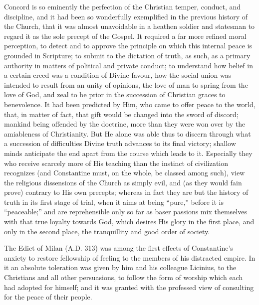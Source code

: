 Concord is so eminently the perfection of the Christian temper,
conduct, and discipline, and it had been so wonderfully exemplified in
the previous history of the Church, that it was almost
unavoidable in a heathen soldier and statesman to regard it as the
sole precept of the Gospel. It required a far more refined moral
perception, to detect and to approve the principle on which this
internal peace is grounded in Scripture; to submit to the dictation of
truth, as such, as a primary authority in matters of political and
private conduct; to understand how belief in a certain creed was a
condition of Divine favour, how the social union was intended to
result from an unity of opinions, the love of man to spring from the
love of God, and zeal to be prior in the succession of Christian
graces to benevolence. It had been predicted by Him, who came to offer
peace to the world, that, in matter of fact, that gift would be
changed into the sword of discord; mankind being offended by the
doctrine, more than they were won over by the amiableness of
Christianity. But He alone was able thus to discern through what a
succession of difficulties Divine truth advances to its final victory;
shallow minds anticipate the end apart from the course which leads to
it. Especially they who receive scarcely more of His teaching than the
instinct of civilization recognizes (and Constantine must, on the
whole, be classed among such), view the religious dissensions of the
Church as simply evil, and (as they would fain prove) contrary to His
own precepts; whereas in fact they are but the history of truth in its
first stage of trial, when it aims at being ``pure,'' before
it is ``peaceable;'' and are reprehensible only so far as
baser passions mix themselves with that true loyalty towards God,
which desires His glory in the first place, and only in the second
place, the tranquillity and good order of society.

The Edict of Milan (A.D. 313) was among the
first effects of Constantine's anxiety to restore fellowship of
feeling to the members of his distracted empire. In it an absolute
toleration was given by him and his colleague Licinius, to the
Christians and all other persuasions, to follow the form of worship
which each had adopted for himself; and it was granted with the
professed view of consulting for the peace of their people.

